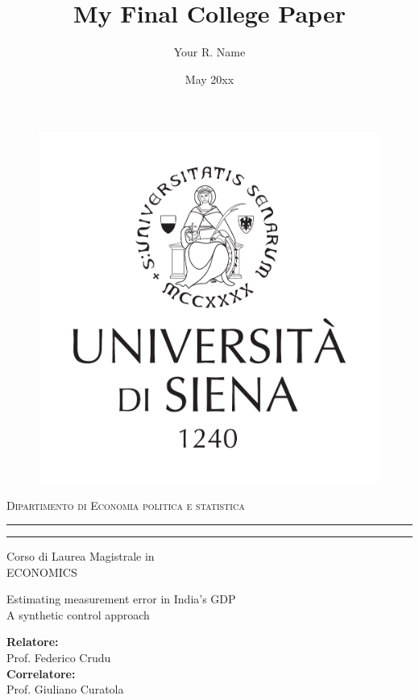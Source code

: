 \documentclass[12pt,nobind, a4paper]{reedthesis}
\title{My Final College Paper}
\author{Your R. Name}
\date{May 20xx}
\begin{document}
	
		\begin{titlepage}
		\topmargin -2.5cm
	\end{titlepage}
	\begin{figure}[ht]
		\begin{center}
			\includegraphics[scale=.34]{unisilogo.pdf}
		\end{center}
	\end{figure}
	\begin{center}
		{{\Large{\textsc{Dipartimento di Economia politica e statistica}}}}
		\rule[0.1cm]{15.8cm}{0.1mm}
		\rule[0.5cm]{15.8cm}{0.6mm}
		\renewcommand*\rmdefault{cmss}
		Corso di Laurea Magistrale in \\ ECONOMICS 
	\end{center}
	\begin{center}
		\begin{huge}
			Estimating measurement error in India's GDP\\
			\vspace{3mm}
			\Large A synthetic control approach
		\end{huge}
	\end{center}
	\vspace{12mm}
	\par
	\noindent
	\begin{minipage}[t]{0.55\textwidth}
		{\large{\textbf{Relatore:}\\
				Prof. Federico Crudu}\\
			\textbf{Correlatore:}\\
			Prof. Giuliano Curatola}
	\end{minipage}
\end{document}
